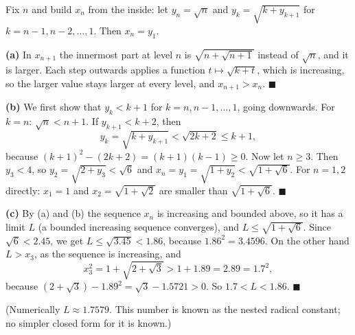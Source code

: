 Fix $n$ and build $x_n$ from the inside: let $y_n=\sqrt n$ and $y_k=\sqrt{k+y_{k+1}}$ for $k=n-1,n-2,\dots,1$. Then $x_n=y_1$.

\textbf{(a)} In $x_{n+1}$ the innermost part at level $n$ is $\sqrt{n+\sqrt{n+1}}$ instead of $\sqrt n$, and it is larger. Each step outwards applies a function $t\mapsto\sqrt{k+t}$, which is increasing, so the larger value stays larger at every level, and $x_{n+1}>x_n$. $\blacksquare$

\textbf{(b)} We first show that $y_k<k+1$ for $k=n,n-1,\dots,1$, going downwards. For $k=n$: $\sqrt n<n+1$. If $y_{k+1}<k+2$, then
\[y_k=\sqrt{k+y_{k+1}}<\sqrt{2k+2}\le k+1,\]
because $(k+1)^2-(2k+2)=(k+1)(k-1)\ge0$. Now let $n\ge3$. Then $y_3<4$, so $y_2=\sqrt{2+y_3}<\sqrt6$ and $x_n=y_1=\sqrt{1+y_2}<\sqrt{1+\sqrt6}$. For $n=1,2$ directly: $x_1=1$ and $x_2=\sqrt{1+\sqrt2}$ are smaller than $\sqrt{1+\sqrt6}$. $\blacksquare$

\textbf{(c)} By (a) and (b) the sequence $x_n$ is increasing and bounded above, so it has a limit $L$ (a bounded increasing sequence converges), and $L\le\sqrt{1+\sqrt6}$. Since $\sqrt6<2.45$, we get $L\le\sqrt{3.45}<1.86$, because $1.86^2=3.4596$. On the other hand $L>x_3$, as the sequence is increasing, and
\[x_3^2=1+\sqrt{2+\sqrt3}>1+1.89=2.89=1.7^2,\]
because $\left(2+\sqrt3\right)-1.89^2=\sqrt3-1.5721>0$. So $1.7<L<1.86$. $\blacksquare$

(Numerically $L\approx1.7579$. This number is known as the nested radical constant; no simpler closed form for it is known.)
